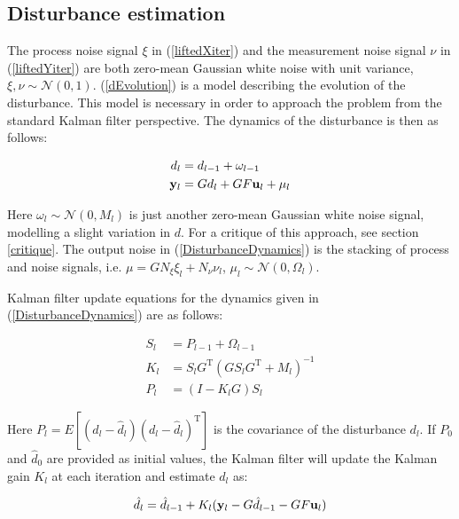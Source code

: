 \subsection{Disturbance estimation}
\label{ILC_Kalman}

The process noise signal $\xi$ in (\ref{liftedXiter}) and the measurement noise signal $\nu$ in (\ref{liftedYiter}) are both zero-mean Gaussian white noise with unit variance, $\xi, \nu \sim \mathcal{N}(0,1)$.
(\ref{dEvolution}) is a model describing the evolution of the disturbance. This model is necessary in order to approach the problem from the standard Kalman filter perspective. The dynamics of the disturbance is then as follows:

\begin{equation}
\begin{aligned}
d_{l} &= d_{l-1}	+ \omega_{l-1} \\
\mathbf{y}_{l} &= Gd_{l} + GF\mathbf{u}_{l} + \mu_{l} \label{DisturbanceDynamics}
\end{aligned}
\end{equation}

Here $\omega_{l} \sim \mathcal{N}(0, M_{l})$ is just another zero-mean Gaussian white noise signal, modelling a slight variation in $d$. For a critique of this approach, see section \ref{critique}. The output noise in (\ref{DisturbanceDynamics}) is the stacking of process and noise signals, i.e. $\mu = G N_{\xi}\xi_{l} + N_{\nu}\nu_{l}$, $\mu_{l} \sim \mathcal{N}(0, \Omega_{l})$. 

Kalman filter update equations for the dynamics given in (\ref{DisturbanceDynamics}) are as follows:

\begin{align}
S_{l} &= P_{l-1} + \Omega_{l-1} \\
K_{l} &= S_{l}G^{\mathrm{T}}(GS_{l}G^{\mathrm{T}} + M_{l})^{-1} \\
P_{l} &= (I - K_{l}G)S_{l}
\label{Kalman}
\end{align}

Here $P_{l} = E[(d_{l} - \hat{d}_{l})(d_{l} - \hat{d}_{l})^{\mathrm{T}}]$ is the covariance of the disturbance $d_{l}$. If $P_{0}$ and $\hat{d}_{0}$ are provided as initial values, the Kalman filter will update the Kalman gain $K_{l}$ at each iteration and estimate $d_{l}$ as:

\begin{equation}
\hat{d}_{l} = \hat{d}_{l-1} + K_{l}(\mathbf{y}_{l} - G\hat{d}_{l-1} - GF\mathbf{u}_{l})
\end{equation}

